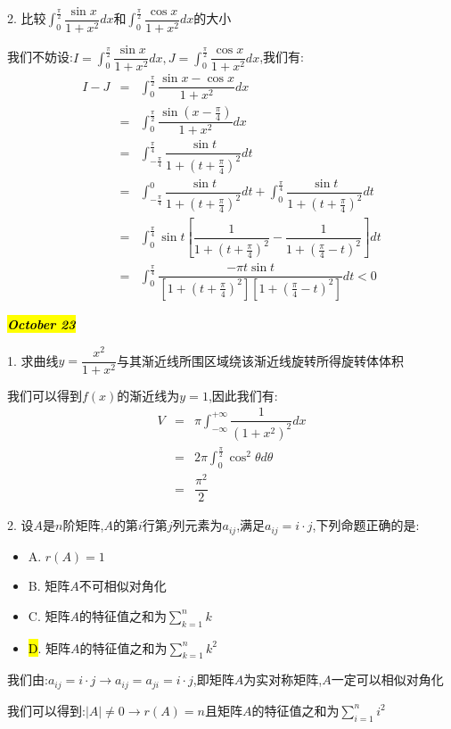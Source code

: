 2. 比较$\int_{0}^{\frac{\pi}{2}}\dfrac{\sin x}{1+x^2}dx$和$\int_{0}^{\frac{\pi}{2}}\dfrac{\cos x}{1+x^2}dx$的大小
\begin{solution}

	我们不妨设:$I=\int_{0}^{\frac{\pi}{2}}\dfrac{\sin x}{1+x^2}dx,J=\int_{0}^{\frac{\pi}{2}}\dfrac{\cos x}{1+x^2}dx$,我们有:
	\begin{eqnarray*}
		I-J&=&\int_{0}^{\frac{\pi}{2}}\dfrac{\sin x-\cos x}{1+x^2}dx\\
		&=&\int_{0}^{\frac{\pi}{2}}\dfrac{\sin(x-\frac{\pi}{4})}{1+x^2}dx\\
		&=&\int_{-\frac{\pi}{4}}^{\frac{\pi}{4}}\dfrac{\sin t}{1+(t+\frac{\pi}{4})^2}dt\\
		&=&\int_{-\frac{\pi}{4}}^{0}\dfrac{\sin t}{1+(t+\frac{\pi}{4})^2}dt+\int_{0}^{\frac{\pi}{4}}\dfrac{\sin t}{1+(t+\frac{\pi}{4})^2}dt\\
		&=&\int_{0}^{\frac{\pi}{4}}\sin t[\dfrac{1}{1+(t+\frac{\pi}{4})^2}-\dfrac{1}{1+(\frac{\pi}{4}-t)^2}]dt\\
		&=&\int_{0}^{\frac{\pi}{4}}\dfrac{-\pi t\sin t}{[1+(t+\frac{\pi}{4})^2][1+(\frac{\pi}{4}-t)^2]}dt<0
	\end{eqnarray*}
	
\end{solution}

\hl{\textbf{\textit{October 23}}}

1. 求曲线$y=\dfrac{x^2}{1+x^2}$与其渐近线所围区域绕该渐近线旋转所得旋转体体积
\begin{solution}

	我们可以得到$f(x)$的渐近线为$y=1$,因此我们有:
	\begin{eqnarray*}
		V&=&\pi\int_{-\infty}^{+\infty}\dfrac{1}{(1+x^2)^2}dx\\
		&=&2\pi\int_{0}^{\frac{\pi}{2}}\cos^2\theta d\theta\\
		&=&\dfrac{\pi^2}{2}
	\end{eqnarray*}
\end{solution}

2. 设$A$是$n$阶矩阵,$A$的第$i$行第$j$列元素为$a_{ij}$,满足$a_{ij}=i\cdot j$,下列命题正确的是:  
\begin{itemize}
	\item A. $r(A)=1$
	\item B. 矩阵$A$不可相似对角化
	\item C. 矩阵$A$的特征值之和为$\sum\limits_{k=1}^{n}k$
	\item \hl{D}. 矩阵$A$的特征值之和为$\sum\limits_{k=1}^{n}k^2$
\end{itemize}
\begin{solution}

	我们由:$a_{ij}=i\cdot j\rightarrow a_{ij}=a_{ji}=i\cdot j$,即矩阵$A$为实对称矩阵,$A$一定可以相似对角化
	
	我们可以得到:$|A|\neq 0\rightarrow r(A)=n$且矩阵$A$的特征值之和为$\sum\limits_{i=1}^{n}i^2$
\end{solution}

